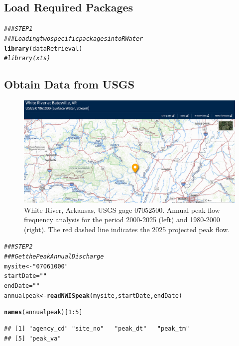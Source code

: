 \documentclass{tufte-handout}\usepackage[]{graphicx}\usepackage[]{xcolor}
\makeatletter
\newcommand{\hlnum}[1]{\textcolor[rgb]{0.686,0.059,0.569}{#1}}%
\newcommand{\hlstr}[1]{\textcolor[rgb]{0.192,0.494,0.8}{#1}}%
\newcommand{\hlcom}[1]{\textcolor[rgb]{0.678,0.584,0.686}{\textit{#1}}}%
\newcommand{\hlopt}[1]{\textcolor[rgb]{0,0,0}{#1}}%
\newcommand{\hlstd}[1]{\textcolor[rgb]{0.345,0.345,0.345}{#1}}%
\newcommand{\hlkwb}[1]{\textcolor[rgb]{0.69,0.353,0.396}{#1}}%
\newcommand{\hlkwd}[1]{\textcolor[rgb]{0.737,0.353,0.396}{\textbf{#1}}}%
\newenvironment{kframe}{%
 \def\at@end@of@kframe{}%
 \ifinner\ifhmode%
  \def\at@end@of@kframe{\end{minipage}}%
  \begin{minipage}{\columnwidth}%
 \fi\fi%
 \def\FrameCommand##1{\hskip\@totalleftmargin \hskip-\fboxsep
 \colorbox{shadecolor}{##1}\hskip-\fboxsep
     \hskip-\linewidth \hskip-\@totalleftmargin \hskip\columnwidth}%
 \MakeFramed {\advance\hsize-\width
   \@totalleftmargin\z@ \linewidth\hsize
   \@setminipage}}%
 {\par\unskip\endMakeFramed%
 \at@end@of@kframe}
\newenvironment{knitrout}{}{} %
\makeatother
\begin{document}
\subsection{Load Required Packages}
\begin{knitrout}
\color{fgcolor}\begin{kframe}
\begin{alltt}
\hlcom{### STEP 1}
\hlcom{### Loading two specific packages into RWater}
\hlkwd{library}\hlstd{(dataRetrieval)}
\hlcom{# library(xts)}
\end{alltt}
\end{kframe}
\end{knitrout}

\subsection{Obtain Data from USGS}

\begin{figure}
	\centering
		\includegraphics[width=1.00\textwidth]{figure/WhiteRiver.png}
		\caption{White River, Arkansas, USGS gage 07052500. Annual peak flow frequency analysis for the period 2000-2025 (left) and 1980-2000 (right). The red dashed line indicates the 2025 projected peak flow.}
	\label{fig:White River}
\end{figure}

\begin{knitrout}
\color{fgcolor}\begin{kframe}
\begin{alltt}
\hlcom{### STEP 2}
\hlcom{### Get the Peak Annual Discharge}
\hlstd{mysite} \hlkwb{<-} \hlstr{"07061000"}
\hlstd{startDate} \hlkwb{=} \hlstr{""}
\hlstd{endDate} \hlkwb{=} \hlstr{""}
\hlstd{annualpeak}\hlkwb{<-}\hlkwd{readNWISpeak}\hlstd{(mysite, startDate, endDate)}

\hlkwd{names}\hlstd{(annualpeak)[}\hlnum{1}\hlopt{:}\hlnum{5}\hlstd{]}
\end{alltt}
\begin{verbatim}
## [1] "agency_cd" "site_no"   "peak_dt"   "peak_tm"  
## [5] "peak_va"
\end{verbatim}
\end{kframe}
\end{knitrout}
\end{document}
